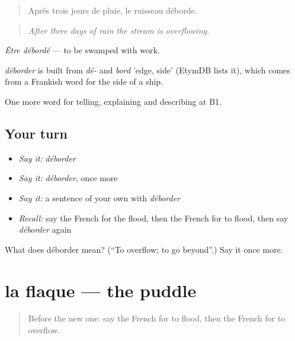 \begin{quote}
Après trois jours de pluie, le ruisseau déborde.
\end{quote}

\begin{quote}
\emph{After three days of rain the stream is overflowing.}
\end{quote}

\emph{Être débordé} — to be swamped with work.

\begin{cousinweb}
\emph{déborder} is built from \emph{dé-} and \emph{bord} 'edge, side' (EtymDB lists it), which comes from a Frankish word for the side of a ship.
\end{cousinweb}

\begin{grammarlens}[title={What you've built}]
One more word for telling, explaining and describing at B1.
\end{grammarlens}

\subsection*{Your turn}
\begin{itemize}
\raggedright
  \item \emph{Say it:} \emph{déborder}
  \item \emph{Say it:} \emph{déborder}, once more
  \item \emph{Say it:} a sentence of your own with \emph{déborder}
  \item \emph{Recall:} say the French for the flood, then the French for to flood, then say \emph{déborder} again
\end{itemize}

\begin{tcolorbox}[breakable,colback=teal!4,colframe=teal!35!black,title={Before you move on}]
What does déborder mean? (\textquotedblleft{}To overflow; to go beyond\textquotedblright{}.) Say it once more.
\end{tcolorbox}
\section[la flaque]{la flaque — the puddle}

\label{lesson:FR-C465-flaque}



\begin{quote}
Before the new one: say the French for to flood, then the French for to overflow.
\end{quote}


